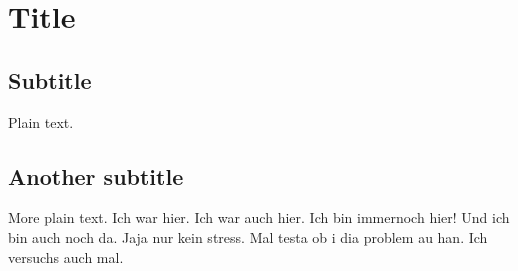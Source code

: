 \documentclass{article}
\begin{document}
\section{Title}

\subsection{Subtitle}

Plain text.

\subsection{Another subtitle}

More plain text.
Ich war hier.
Ich war auch hier.
Ich bin immernoch hier!
Und ich bin auch noch da.
Jaja nur kein stress.
Mal testa ob i dia problem au han.
Ich versuchs auch mal.
\end{document}
